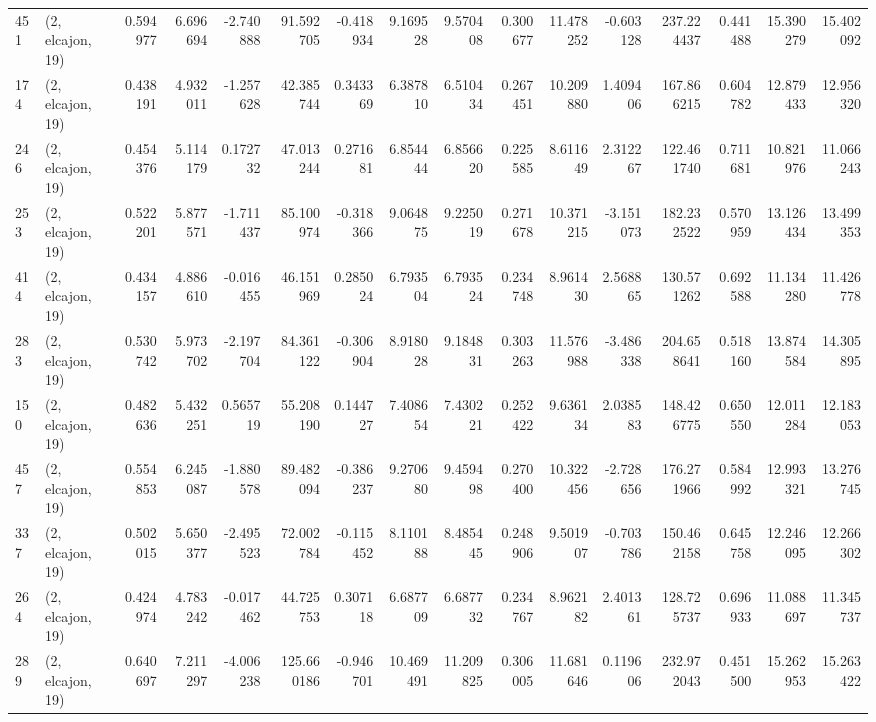 \begin{tabular}{llrrrrrrrrrrrrrr}
451 &  (2, elcajon, 19) &   0.594977 &   6.696694 &  -2.740888 &    91.592705 &  -0.418934 &   9.169528 &   9.570408 &  0.300677 &  11.478252 &  -0.603128 &   237.224437 &  0.441488 &  15.390279 &  15.402092 \\
174 &  (2, elcajon, 19) &   0.438191 &   4.932011 &  -1.257628 &    42.385744 &   0.343369 &   6.387810 &   6.510434 &  0.267451 &  10.209880 &   1.409406 &   167.866215 &  0.604782 &  12.879433 &  12.956320 \\
246 &  (2, elcajon, 19) &   0.454376 &   5.114179 &   0.172732 &    47.013244 &   0.271681 &   6.854444 &   6.856620 &  0.225585 &   8.611649 &   2.312267 &   122.461740 &  0.711681 &  10.821976 &  11.066243 \\
253 &  (2, elcajon, 19) &   0.522201 &   5.877571 &  -1.711437 &    85.100974 &  -0.318366 &   9.064875 &   9.225019 &  0.271678 &  10.371215 &  -3.151073 &   182.232522 &  0.570959 &  13.126434 &  13.499353 \\
414 &  (2, elcajon, 19) &   0.434157 &   4.886610 &  -0.016455 &    46.151969 &   0.285024 &   6.793504 &   6.793524 &  0.234748 &   8.961430 &   2.568865 &   130.571262 &  0.692588 &  11.134280 &  11.426778 \\
283 &  (2, elcajon, 19) &   0.530742 &   5.973702 &  -2.197704 &    84.361122 &  -0.306904 &   8.918028 &   9.184831 &  0.303263 &  11.576988 &  -3.486338 &   204.658641 &  0.518160 &  13.874584 &  14.305895 \\
150 &  (2, elcajon, 19) &   0.482636 &   5.432251 &   0.565719 &    55.208190 &   0.144727 &   7.408654 &   7.430221 &  0.252422 &   9.636134 &   2.038583 &   148.426775 &  0.650550 &  12.011284 &  12.183053 \\
457 &  (2, elcajon, 19) &   0.554853 &   6.245087 &  -1.880578 &    89.482094 &  -0.386237 &   9.270680 &   9.459498 &  0.270400 &  10.322456 &  -2.728656 &   176.271966 &  0.584992 &  12.993321 &  13.276745 \\
337 &  (2, elcajon, 19) &   0.502015 &   5.650377 &  -2.495523 &    72.002784 &  -0.115452 &   8.110188 &   8.485445 &  0.248906 &   9.501907 &  -0.703786 &   150.462158 &  0.645758 &  12.246095 &  12.266302 \\
264 &  (2, elcajon, 19) &   0.424974 &   4.783242 &  -0.017462 &    44.725753 &   0.307118 &   6.687709 &   6.687732 &  0.234767 &   8.962182 &   2.401361 &   128.725737 &  0.696933 &  11.088697 &  11.345737 \\
289 &  (2, elcajon, 19) &   0.640697 &   7.211297 &  -4.006238 &   125.660186 &  -0.946701 &  10.469491 &  11.209825 &  0.306005 &  11.681646 &   0.119606 &   232.972043 &  0.451500 &  15.262953 &  15.263422 \\

\end{tabular}
